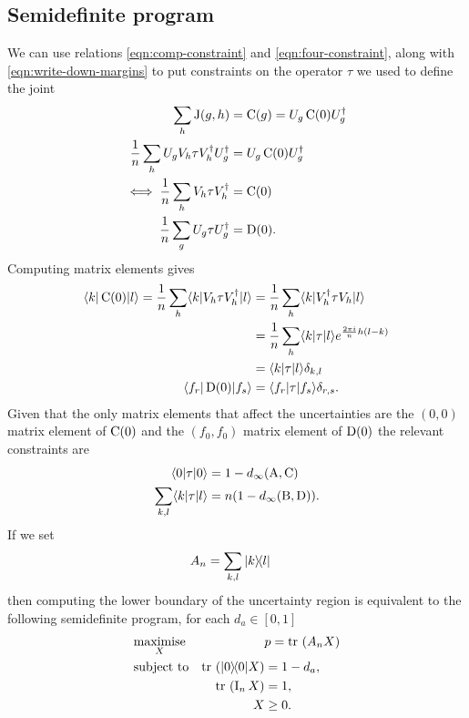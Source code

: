 \subsection{Semidefinite program}
We can use relations \eqref{eqn:comp-constraint} and \eqref{eqn:four-constraint}, along with \eqref{eqn:write-down-margins} to put constraints on the operator $\tau$ we used to define the joint
\begin{align}
  \sum_h \operatorname{J}(g,h) &= \operatorname{C}(g) = U_g \operatorname{C}(0) U_g^\dagger\\
  \frac{1}{n} \sum_h U_gV_h \tau V_h^\dagger U_g^\dagger &= U_g \operatorname{C}(0) U_g^\dagger\\
  \iff \frac{1}{n} \sum_h V_h \tau V_h^\dagger  &=  \operatorname{C}(0)  \\
  \frac{1}{n} \sum_g U_g \tau U_g^\dagger  &=  \operatorname{D}(0).
\end{align}
Computing matrix elements gives
\begin{align}
  \langle k | \operatorname{C}(0) | l \rangle = \frac{1}{n} \sum_h \langle k | V_h \tau V_h^\dagger | l \rangle &= \frac{1}{n} \sum_h \langle k | V_h^\dagger \tau V_h | l \rangle \\
                                                                          &= \frac{1}{n} \sum_h \langle k |\tau | l \rangle e^{\frac{2\pi i}{n} h(l-k)}\\
                                                                          &= \langle k |\tau | l \rangle \delta_{k,l}\\
  \langle f_r | \operatorname{D}(0) | f_s \rangle &= \langle f_r |\tau | f_s \rangle \delta_{r,s}.
\end{align}
Given that the only matrix elements that affect the uncertainties are the $(0,0)$ matrix element of $\operatorname{C}(0)$ and the $(f_0, f_0)$ matrix element of $\operatorname{D}(0)$ the relevant constraints are
\begin{align}
  \langle 0 |\tau| 0 \rangle &= 1 - d_\infty(\operatorname{A},\operatorname{C})\\
  \sum_{k,l} \langle k |\tau| l \rangle &=  n(1- d_\infty(\operatorname{B},\operatorname{D})).
\end{align}
If we set 
\begin{align}
  A_n &= \sum_{k,l} |k\rangle\!\langle l|
\end{align}
then computing the lower boundary of the uncertainty region is equivalent to the following semidefinite program, for each $d_a\in [0,1]$
\begin{equation}
  \begin{aligned}
    & \underset{X}{\text{maximise}}
    & & p = \tr{A_n X} \\
    & \text{subject to}
    & \tr{\ketbra{0}{0} X} &= 1-d_a, \\
    &&  \tr{\opi_n  X} &= 1, \\
    && X &\geq 0.
  \end{aligned}
  \label{eqn:semidefinite-program}
\end{equation}
